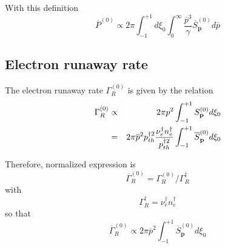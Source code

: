 With this definition 
\begin{equation}
\overline{P}^{\left( 0\right) }\propto 2\pi \int_{-1}^{+1}d\xi
_{0}\int_{0}^{\infty }\frac{\overline{p}^{3}}{\gamma }\overline{S}_{\mathbf{p%
}}^{\left( 0\right) }d\overline{p}
\end{equation}

\subsection{Electron runaway rate}

The electron runaway rate $\Gamma _{R}^{\left( 0\right) }$ is given by the
relation 
\begin{eqnarray}
\Gamma _{R}^{\left( 0\right) } &\propto &2\pi p^{2}\int_{-1}^{+1}S_{\mathbf{p%
}}^{\left( 0\right) }d\xi _{0}  \notag \\
&=&2\pi \overline{p}^{2}p_{th}^{\dag 2}\frac{\nu _{e}^{\dag }n_{e}^{\dag }}{%
p_{th}^{\dag 2}}\int_{-1}^{+1}\overline{S}_{\mathbf{p}}^{\left( 0\right)
}d\xi _{0}
\end{eqnarray}

Therefore, normalized expression is 
\begin{equation}
\overline{\Gamma }_{R}^{\left( 0\right) }=\Gamma _{R}^{\left( 0\right)
}/\Gamma _{R}^{\dag }
\end{equation}
with 
\begin{equation}
\Gamma _{R}^{\dag }=\nu _{e}^{\dag }n_{e}^{\dag }
\end{equation}
so that 
\begin{equation}
\overline{\Gamma }_{R}^{\left( 0\right) }\propto 2\pi \overline{p}%
^{2}\int_{-1}^{+1}\overline{S}_{\mathbf{p}}^{\left( 0\right) }d\xi _{0}
\end{equation}

